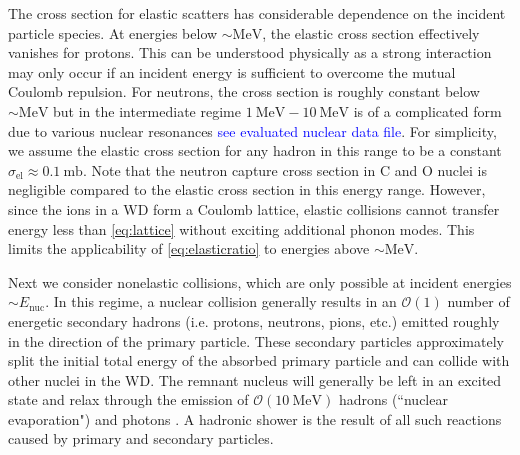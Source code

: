 \documentclass[twocolumn,showpacs,preprintnumbers,amsmath,amssymb,prd]{revtex4}
\newcommand{\OO}{\mathcal{O}}
\begin{document}
\begin{appendices}
The cross section for elastic scatters has considerable dependence on the incident particle species. At energies below $\sim \text{MeV}$, the elastic cross section effectively vanishes for  protons. This can be understood physically as a strong interaction may only occur if an incident energy is sufficient to overcome the mutual Coulomb repulsion. For neutrons, the cross section is roughly constant below $\sim \text{MeV}$ but in the intermediate regime $1 ~\text{MeV} - \text{10} ~\text{MeV}$ is of a complicated form due to various nuclear resonances \textcolor{blue}{see evaluated nuclear data file}. For simplicity, we assume the elastic cross section for any hadron in this range to be a constant $\sigma_\text{el} \approx 0.1 ~\text{mb}$. Note that the neutron capture cross section in C and O nuclei is negligible compared to the elastic cross section in this energy range. However, since the ions in a WD form a Coulomb lattice, elastic collisions cannot transfer energy less than \eqref{eq:lattice} without exciting additional phonon modes. This limits the applicability of \eqref{eq:elasticratio} to energies above $\sim \text{MeV}$.  

Next we consider nonelastic collisions, which are only possible at incident energies $\sim E_\text{nuc}$. In this regime, a nuclear collision generally results in an $\OO(1)$ number of energetic secondary hadrons (i.e. protons, neutrons, pions, etc.) emitted roughly in the direction of the primary particle. These secondary particles approximately split the initial total energy of the absorbed primary particle and can collide with other nuclei in the WD. The remnant nucleus will generally be left in an excited state and relax through the emission of $\OO(10 ~\text{MeV})$ hadrons (``nuclear evaporation") and photons \cite{Rossi}. A hadronic shower is the result of all such reactions caused by primary and secondary particles. 


\end{appendices}
\end{document}
